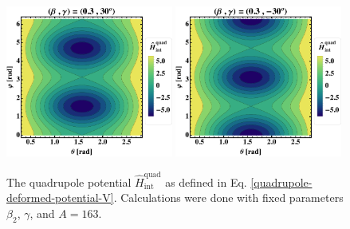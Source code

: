 \begin{figure}
    \centering
    \includegraphics[width=0.49\textwidth]{Chapters/Figures/quadrupole-potentialV-3.pdf}
    \includegraphics[width=0.49\textwidth]{Chapters/Figures/quadrupole-potentialV-4.pdf}
    \caption{The quadrupole potential $\hat{H}_\text{int}^\text{quad}$ as defined in Eq. \ref{quadrupole-deformed-potential-V}. Calculations were done with fixed parameters $\beta_2$, $\gamma$, and $A=163$.}
    \label{figs-deformed-quadrupole-potential-2}
\end{figure}

